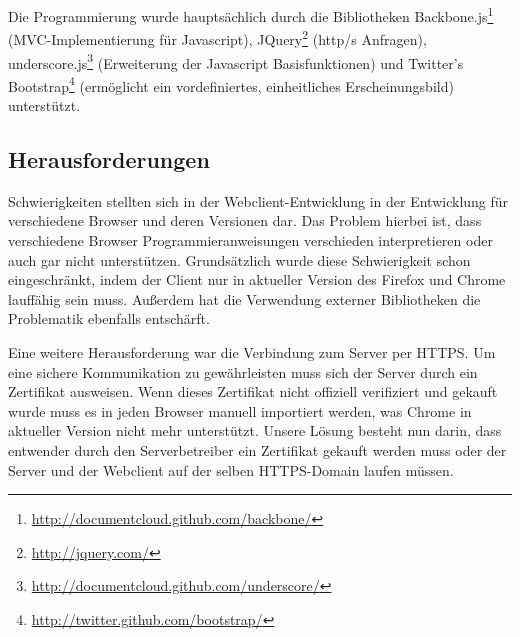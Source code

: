 Die Programmierung wurde hauptsächlich durch die Bibliotheken 
Backbone.js\footnote{\url{http://documentcloud.github.com/backbone/}} (MVC-Implementierung für Javascript), 
JQuery\footnote{\url{http://jquery.com/}} (http/s Anfragen), 
underscore.js\footnote{\url{http://documentcloud.github.com/underscore/}} (Erweiterung der Javascript Basisfunktionen) und 
Twitter's Bootstrap\footnote{\url{http://twitter.github.com/bootstrap/}} (ermöglicht ein vordefiniertes, einheitliches Erscheinungsbild) unterstützt.

\subsection*{Herausforderungen}

Schwierigkeiten stellten sich in der Webclient-Entwicklung in der Entwicklung für verschiedene Browser und deren Versionen dar.
Das Problem hierbei ist, dass verschiedene Browser Programmieranweisungen verschieden interpretieren oder auch gar nicht unterstützen. 
Grundsätzlich wurde diese Schwierigkeit schon eingeschränkt, indem der Client nur in aktueller Version des Firefox und Chrome lauffähig sein muss. Außerdem hat die Verwendung externer Bibliotheken die Problematik ebenfalls entschärft.

Eine weitere Herausforderung war die Verbindung zum Server per HTTPS.
Um eine sichere Kommunikation zu gewährleisten muss sich der Server durch ein Zertifikat ausweisen.
Wenn dieses Zertifikat nicht offiziell verifiziert und gekauft wurde muss es in jeden Browser manuell importiert werden, was Chrome in aktueller Version nicht mehr unterstützt.
Unsere Lösung besteht nun darin, dass entwender durch den Serverbetreiber ein Zertifikat gekauft werden muss oder der Server und der Webclient auf der selben HTTPS-Domain laufen müssen.